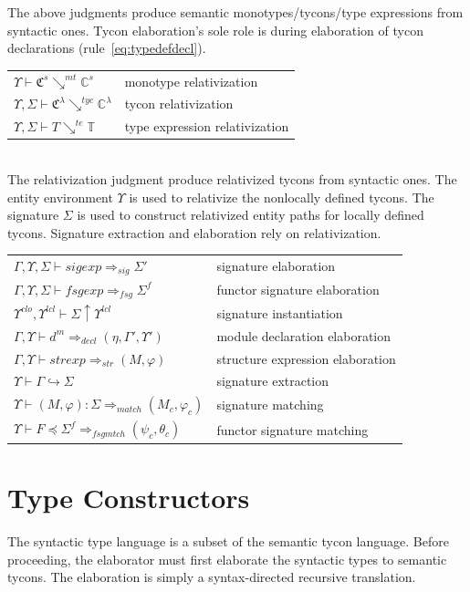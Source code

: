 The above judgments produce semantic monotypes/tycons/type expressions from syntactic ones. Tycon elaboration's sole role is during elaboration of tycon declarations (rule~\ref{eq:typedefdecl}). \\[-5mm]

\begin{tabular}{ll}       
        $\Upsilon\vdash \mathfrak{C}^s \searrow^{mt} \mathbb{C}^s$ & monotype relativization\\
        $\Upsilon,\Sigma\vdash \mathfrak{C}^\lambda \searrow^{tyc} \mathbb{C}^\lambda$ & tycon relativization\\
        $\Upsilon,\Sigma\vdash T \searrow^{te} \mathbb{T}$ & type expression relativization
\end{tabular}\\

The relativization judgment produce relativized tycons from syntactic ones. The entity environment $\Upsilon$ is used to relativize the nonlocally defined tycons. The signature $\Sigma$ is used to construct relativized entity paths for locally defined tycons. Signature extraction and elaboration rely on relativization. \\[-5mm]

\begin{tabular}{ll}      
        $\Gamma,\Upsilon,\Sigma\vdash sigexp \Rightarrow_{sig} \Sigma'$ & signature elaboration\\
        $\Gamma,\Upsilon,\Sigma\vdash fsgexp \Rightarrow_{fsg} \Sigma^f$ & functor signature elaboration\\
        $\Upsilon^{clo},\Upsilon^{lcl}\vdash \Sigma \uparrow \Upsilon^{lcl}$ & signature instantiation\\
        $\Gamma,\Upsilon\vdash d^m \Rightarrow_{decl} (\eta,\Gamma',\Upsilon')$ & module declaration elaboration\\
        $\Gamma,\Upsilon\vdash strexp \Rightarrow_{str} (M, \varphi)$ & structure expression elaboration\\
        $\Upsilon\vdash\Gamma\hookrightarrow \Sigma$ & signature extraction\\
        $\Upsilon\vdash(M,\varphi):\Sigma\Rightarrow_{match} (M_c,\varphi_c)$ & signature matching\\
        $\Upsilon\vdash F \preceq \Sigma^f \Rightarrow_{fsgmtch} (\psi_c, \theta_c)$ & functor signature matching
\end{tabular}

\section{Type Constructors}
The syntactic type language is a subset of the semantic tycon language. Before proceeding, the elaborator must first elaborate the syntactic types to semantic tycons. The elaboration is simply a syntax-directed recursive translation. 

